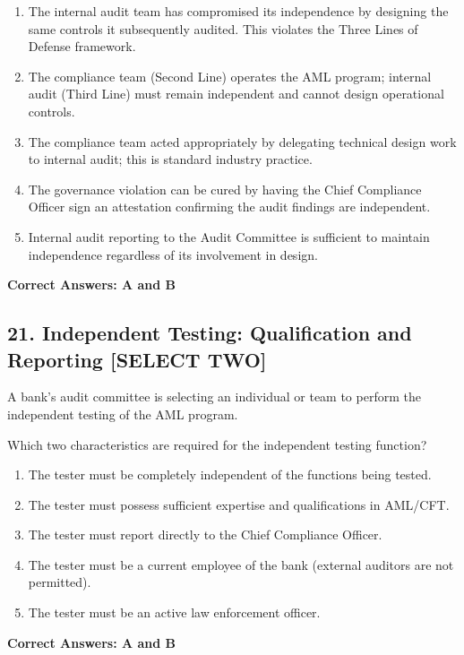 \documentclass[11pt,a4paper]{article}
\begin{document}
	\begin{enumerate}[label=\Alph*.]
		\item The internal audit team has compromised its independence by designing the same controls it subsequently audited. This violates the Three Lines of Defense framework.
		\item The compliance team (Second Line) operates the AML program; internal audit (Third Line) must remain independent and cannot design operational controls.
		\item The compliance team acted appropriately by delegating technical design work to internal audit; this is standard industry practice.
		\item The governance violation can be cured by having the Chief Compliance Officer sign an attestation confirming the audit findings are independent.
		\item Internal audit reporting to the Audit Committee is sufficient to maintain independence regardless of its involvement in design.
	\end{enumerate}
	
	\textbf{Correct Answers: A and B}
	
	\subsection{21. Independent Testing: Qualification and Reporting \textnormal{[SELECT TWO]}}
	
	A bank's audit committee is selecting an individual or team to perform the independent testing of the AML program.
	
	Which two characteristics are required for the independent testing function?
	
	\begin{enumerate}[label=\Alph*.]
		\item The tester must be completely independent of the functions being tested.
		\item The tester must possess sufficient expertise and qualifications in AML/CFT.
		\item The tester must report directly to the Chief Compliance Officer.
		\item The tester must be a current employee of the bank (external auditors are not permitted).
		\item The tester must be an active law enforcement officer.
	\end{enumerate}
	
	\textbf{Correct Answers: A and B}
	
\end{document}

